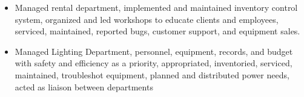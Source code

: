 \documentclass[letterpaper]{article}        %
\begin{document}
    \begin{itemize}
    \item Managed rental department, implemented and maintained inventory control system, organized and led workshops to educate clients and employees, serviced, maintained, reported bugs, customer support, and equipment sales.
    \end{itemize}
  
    \begin{itemize}
    \item Managed Lighting Department, personnel, equipment, records, and budget with safety and efficiency as a priority, appropriated, inventoried, serviced, maintained, troubleshot equipment, planned and distributed power needs, acted as liaison between departments
    \end{itemize}

\end{document}
